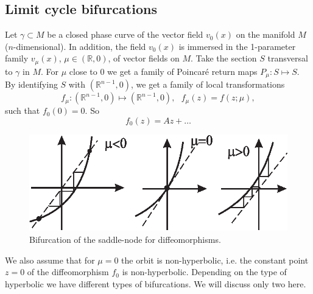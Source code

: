 \subsection{Limit cycle bifurcations}
Let $\gamma \subset M$ be a closed phase curve of the vector field $v_{0}(x)$ on the manifold $M$ ($n$-dimensional). In addition, the field $v_{0}(x)$ is immersed in the 1-parameter family $v_{\mu }(x)$, $\mu \in \left( \mathbb{R},0\right)$, of vector fields on $M$. Take the section $S$ transversal  to $\gamma$ in $M$. For $\mu$ close to 0 we get a family of Poincaré return maps $P_{\mu }:S\longmapsto S.$ By identifying $S$ with $\left( \mathbb{R}%
^{n-1},0\right)$, we get a family of local transformations
$$
f_{\mu }:\left( \mathbb{R}^{n-1},0\right) \longmapsto \left( \mathbb{R}%
^{n-1},0\right) ,\text{ \ \ }f_{\mu }(z)=f(z;\mu ),
$$
such that $f_{0}(0)=0.$ So
$$
f_{0}(z)=Az+\ldots
$$
\begin{figure}[!ht]
	\centering
	\includegraphics [scale=1.4]{jtr317}
	\caption{Bifurcation of the saddle-node for diffeomorphisms.}
	\label{fig:3.17}
\end{figure}
We also assume that for $\mu =0$ the orbit is non-hyperbolic, i.e. the constant point $z=0$ of the diffeomorphism $f_{0}$ is non-hyperbolic. Depending on the type of hyperbolic we have different types of bifurcations. We will discuss only two here.
